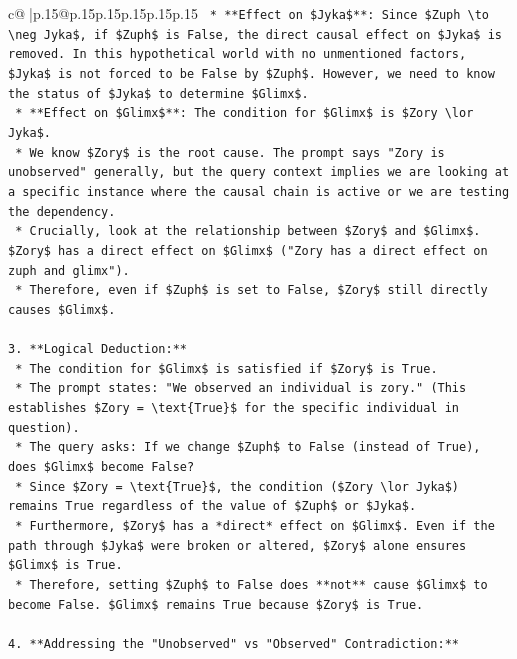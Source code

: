 \documentclass{article}
\begin{document}
{\begin{supertabular}{c@{$\;$}|p{.15\linewidth}@{}p{.15\linewidth}p{.15\linewidth}p{.15\linewidth}p{.15\linewidth}p{.15\linewidth}}
{{{\texttt{    *   **Effect on \$Jyka\$**: Since \$Zuph \textbackslash{}to \textbackslash{}neg Jyka\$, if \$Zuph\$ is False, the direct causal effect on \$Jyka\$ is removed. In this hypothetical world with no unmentioned factors, \$Jyka\$ is not forced to be False by \$Zuph\$. However, we need to know the status of \$Jyka\$ to determine \$Glimx\$.} \\
\texttt{    *   **Effect on \$Glimx\$**: The condition for \$Glimx\$ is \$Zory \textbackslash{}lor Jyka\$.} \\
\texttt{        *   We know \$Zory\$ is the root cause. The prompt says "Zory is unobserved" generally, but the query context implies we are looking at a specific instance where the causal chain is active or we are testing the dependency.} \\
\texttt{        *   Crucially, look at the relationship between \$Zory\$ and \$Glimx\$. \$Zory\$ has a direct effect on \$Glimx\$ ("Zory has a direct effect on zuph and glimx").} \\
\texttt{        *   Therefore, even if \$Zuph\$ is set to False, \$Zory\$ still directly causes \$Glimx\$.} \\
\\ 
\texttt{3.  **Logical Deduction:**} \\
\texttt{    *   The condition for \$Glimx\$ is satisfied if \$Zory\$ is True.} \\
\texttt{    *   The prompt states: "We observed an individual is zory." (This establishes \$Zory = \textbackslash{}text\{True\}\$ for the specific individual in question).} \\
\texttt{    *   The query asks: If we change \$Zuph\$ to False (instead of True), does \$Glimx\$ become False?} \\
\texttt{    *   Since \$Zory = \textbackslash{}text\{True\}\$, the condition (\$Zory \textbackslash{}lor Jyka\$) remains True regardless of the value of \$Zuph\$ or \$Jyka\$.} \\
\texttt{    *   Furthermore, \$Zory\$ has a *direct* effect on \$Glimx\$. Even if the path through \$Jyka\$ were broken or altered, \$Zory\$ alone ensures \$Glimx\$ is True.} \\
\texttt{    *   Therefore, setting \$Zuph\$ to False does **not** cause \$Glimx\$ to become False. \$Glimx\$ remains True because \$Zory\$ is True.} \\
\\ 
\texttt{4.  **Addressing the "Unobserved" vs "Observed" Contradiction:**} \\
}}}
\end{supertabular}}
\end{document}
